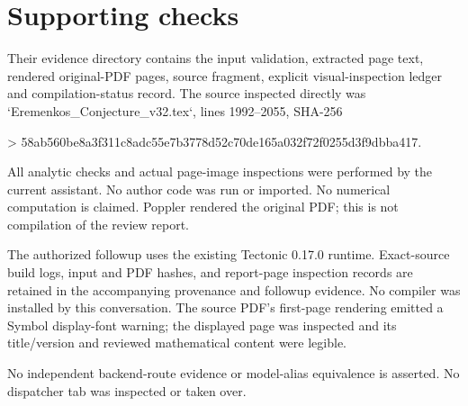 \documentclass[10pt]{article}
\begin{document}
\section*{Supporting checks}
Their evidence directory contains the input validation, extracted page text, rendered original-PDF pages, source fragment, explicit visual-inspection ledger and compilation-status record. The source inspected directly was `Eremenkos\_Conjecture\_v32.tex`, lines 1992–2055, SHA-256\par
> 58ab560be8a3f311c8adc55e7b3778d52c70de165a032f72f0255d3f9dbba417.\par
All analytic checks and actual page-image inspections were performed by the current assistant. No author code was run or imported. No numerical computation is claimed. Poppler rendered the original PDF; this is not compilation of the review report.\par
The authorized followup uses the existing Tectonic 0.17.0 runtime. Exact-source build logs, input and PDF hashes, and report-page inspection records are retained in the accompanying provenance and followup evidence. No compiler was installed by this conversation. The source PDF’s first-page rendering emitted a Symbol display-font warning; the displayed page was inspected and its title/version and reviewed mathematical content were legible.\par
No independent backend-route evidence or model-alias equivalence is asserted. No dispatcher tab was inspected or taken over.\par
\end{document}
